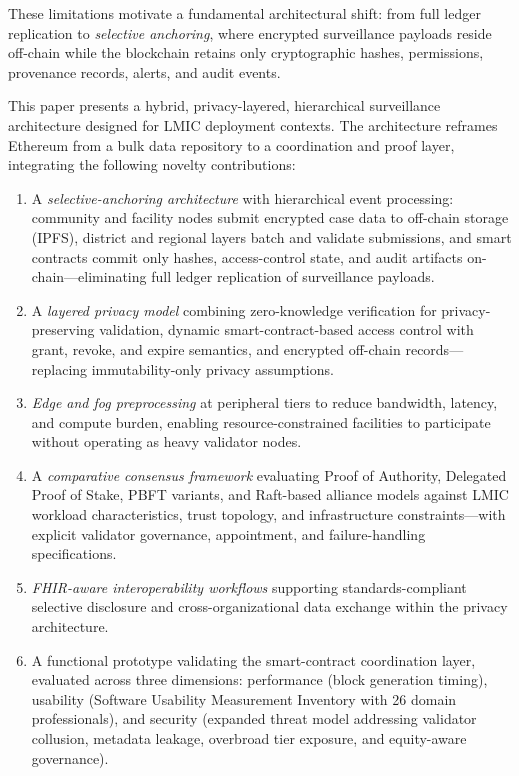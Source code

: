 \documentclass[AMA,LATO1COL]{WileyNJD-v2}
\begin{document}
These limitations motivate a fundamental architectural shift: from full ledger replication to \emph{selective anchoring}, where encrypted surveillance payloads reside off-chain while the blockchain retains only cryptographic hashes, permissions, provenance records, alerts, and audit events.

This paper presents a hybrid, privacy-layered, hierarchical surveillance architecture designed for LMIC deployment contexts. The architecture reframes Ethereum from a bulk data repository to a coordination and proof layer, integrating the following novelty contributions:

\begin{enumerate}
\item A \emph{selective-anchoring architecture} with hierarchical event processing: community and facility nodes submit encrypted case data to off-chain storage (IPFS), district and regional layers batch and validate submissions, and smart contracts commit only hashes, access-control state, and audit artifacts on-chain---eliminating full ledger replication of surveillance payloads.
\item A \emph{layered privacy model} combining zero-knowledge verification for privacy-preserving validation, dynamic smart-contract-based access control with grant, revoke, and expire semantics, and encrypted off-chain records---replacing immutability-only privacy assumptions.
\item \emph{Edge and fog preprocessing} at peripheral tiers to reduce bandwidth, latency, and compute burden, enabling resource-constrained facilities to participate without operating as heavy validator nodes.
\item A \emph{comparative consensus framework} evaluating Proof of Authority, Delegated Proof of Stake, PBFT variants, and Raft-based alliance models against LMIC workload characteristics, trust topology, and infrastructure constraints---with explicit validator governance, appointment, and failure-handling specifications.
\item \emph{FHIR-aware interoperability workflows} supporting standards-compliant selective disclosure and cross-organizational data exchange within the privacy architecture.
\item A functional prototype validating the smart-contract coordination layer, evaluated across three dimensions: performance (block generation timing), usability (Software Usability Measurement Inventory with 26 domain professionals), and security (expanded threat model addressing validator collusion, metadata leakage, overbroad tier exposure, and equity-aware governance).
\end{enumerate}
\end{document}
